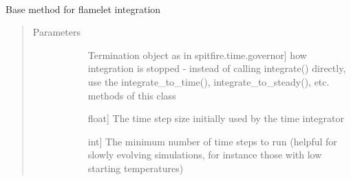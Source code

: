 \documentclass[letterpaper,10pt,english]{sphinxmanual}
\begin{document}
\begin{fulllineitems}

\begin{fulllineitems}
\label{\detokenize{spitfire.chemistry.general_diff_rxn:spitfire.chemistry.general_diff_rxn.DiffusionReaction1D_FiniteDifference.initial_state}}~
\end{fulllineitems}


\begin{fulllineitems}
\label{\detokenize{spitfire.chemistry.general_diff_rxn:spitfire.chemistry.general_diff_rxn.DiffusionReaction1D_FiniteDifference.integrate}}
Base method for flamelet integration
\begin{quote}\begin{description}
\item[{Parameters}] \leavevmode\begin{description}
\item[{}] \leavevmode{[}Termination object as in spitfire.time.governor{]}
how integration is stopped - instead of calling integrate() directly, use the integrate\_to\_time(), integrate\_to\_steady(), etc. methods of this class

\item[{}] \leavevmode{[}float{]}
The time step size initially used by the time integrator

\item[{}] \leavevmode{[}int{]}
The minimum number of time steps to run (helpful for slowly evolving simulations, for instance those with low starting temperatures)


\end{description}
\end{description}
\end{quote}
\end{fulllineitems}
\end{fulllineitems}
\end{document}
